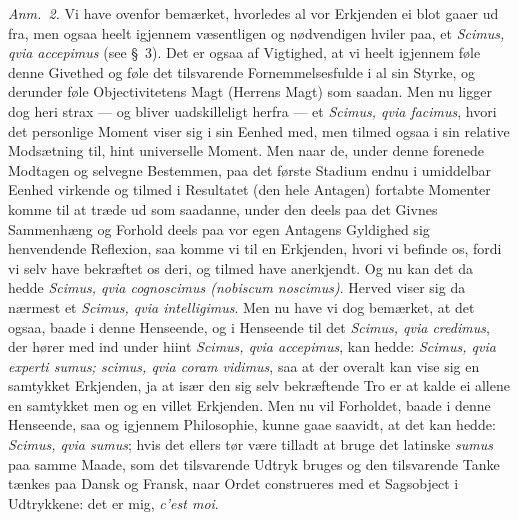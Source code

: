 \documentclass[12pt,a4paper]{book}
\begin{document}
{\small\emph{Anm.~2.} Vi have ovenfor bemærket, hvorledes al vor Erkjenden ei blot
gaaer ud fra, men ogsaa heelt igjennem væsentligen og nødvendigen hviler paa, et
\textit{Scimus, qvia accepimus} (see \S~3). Det er ogsaa af Vigtighed, at vi heelt
igjennem føle denne Givethed og føle det tilsvarende Fornemmelsesfulde i al sin
Styrke, og derunder føle Objectivitetens Magt (Herrens Magt) som saadan. Men nu
ligger dog heri strax --- og bliver uadskilleligt herfra --- et \textit{Scimus, qvia
facimus}, hvori det personlige Moment viser sig i sin Eenhed med, men tilmed ogsaa i
sin relative Modsætning til, hint universelle Moment. Men naar de, under denne
forenede Modtagen og selvegne Bestemmen, paa det første Stadium endnu i umiddelbar
Eenhed virkende og tilmed i Resultatet (den hele Antagen) fortabte Momenter komme
til at træde ud som saadanne, under den deels paa det Givnes Sammenhæng og Forhold
deels paa vor egen Antagens Gyldighed sig henvendende Reflexion, saa komme vi til en
Erkjenden, hvori vi befinde os, fordi vi selv have bekræftet os deri, og tilmed have
anerkjendt. Og nu kan det da hedde \textit{Scimus, qvia cognoscimus (nobiscum
noscimus)}. Herved viser sig da nærmest et \textit{Scimus, qvia intelligimus}. Men
nu have vi dog bemærket, at det ogsaa, baade i denne Henseende, og i Henseende til
det \textit{Scimus, qvia credimus}, der hører med ind under hiint \textit{Scimus,
qvia accepimus}, kan hedde: \textit{Scimus, qvia experti sumus; scimus, qvia coram
vidimus}, saa at der overalt kan vise sig en samtykket Erkjenden, ja at især den sig
selv bekræftende Tro er at kalde ei allene en samtykket men og en villet Erkjenden.
Men nu vil Forholdet, baade i denne Henseende, saa og igjennem Philosophie, kunne
gaae saavidt, at det kan hedde: \textit{Scimus, qvia sumus}; hvis det ellers tør
være tilladt at bruge det latinske \textit{sumus} paa samme Maade, som det
tilsvarende Udtryk bruges og den tilsvarende Tanke tænkes paa Dansk og Fransk, naar
Ordet construeres med et Sagsobject i Udtrykkene: det er mig, \textit{c'est
moi}.\par}
\end{document}
